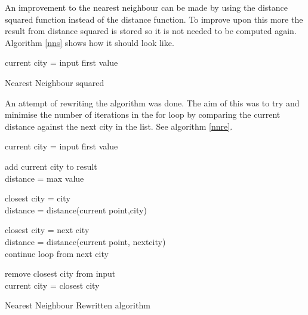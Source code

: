 \documentclass[conference,backref=page]{acmsiggraph}
\begin{document}
An improvement to the nearest neighbour can be made by using the distance squared function instead of the distance function. To improve upon this more the result from distance squared is stored so it is not needed to be computed again. Algorithm \ref{nns} shows how it should look like.

\begin{algorithm}[h]	
	current city = input first value\\
\caption{Nearest Neighbour squared}
\label{nns}
\end{algorithm}\hfill

An attempt of rewriting the algorithm was done. The aim of this was to try and minimise the number of iterations in the for loop by comparing the current distance against the next city in the list. See algorithm \ref{nnre}.
\begin{algorithm}[h]
	current city = input first value\\
	{
		add current city to result\\
		distance = max value\\
		{
			{
				closest city = city\\
				distance = distance(current point,city)\\
			}
			{
				{
					
					closest city = next city \\
					distance = distance(current point, nextcity)\\
					continue loop from next city\\
				}
			}
		}
		remove closest city from input\\
		current city = closest city\\
	}
	\caption{Nearest Neighbour Rewritten algorithm}
	\label{nnre}
\end{algorithm}
\end{document}
